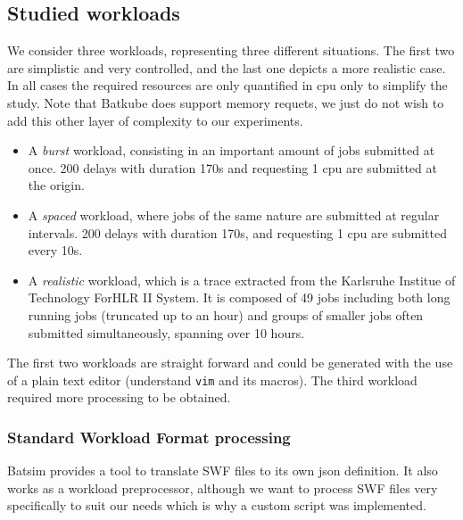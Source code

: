 \subsection{Studied workloads} \label{sec:studied-workloads}

We consider three workloads, representing three different situations. The first
two are simplistic and very controlled, and the last one depicts a more
realistic case. In all cases the required resources are only quantified in cpu
only to simplify the study. Note that Batkube does support memory requets, we
just do not wish to add this other layer of complexity to our experiments.

\begin{itemize}
	\item A \textit{burst} workload, consisting in an important amount of
		jobs submitted at once.  200 delays with duration 170s and
		requesting 1 cpu are submitted at the origin.
	\item A \textit{spaced} workload, where jobs of the same nature are
		submitted at regular intervals.  200 delays with duration 170s,
		and requesting 1 cpu are submitted every 10s.
	\item A \textit{realistic} workload, which is a trace extracted from
		the Karlsruhe Institue of Technology ForHLR II System. It is
		composed of 49 jobs including both long running jobs (truncated
		up to an hour) and groups of smaller jobs often submitted
		simultaneously, spanning over 10 hours.
\end{itemize}

The first two workloads are straight forward and could be generated with the
use of a plain text editor (understand \texttt{vim} and its macros). The third
workload required more processing to be obtained.  

\subsubsection{Standard Workload Format processing}

Batsim provides a tool to translate SWF files to its own json definition. It
also works as a workload preprocessor, although we want to process SWF files
very specifically to suit our needs which is why a custom script was
implemented.

